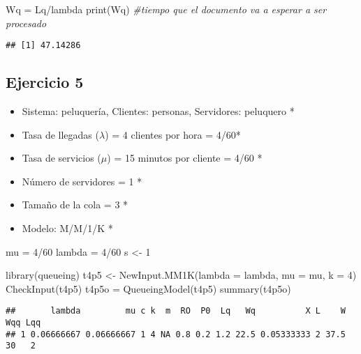 \documentclass[
]{article}
\newenvironment{Shaded}{\begin{snugshade}}{\end{snugshade}}
\newcommand{\AttributeTok}[1]{\textcolor[rgb]{0.77,0.63,0.00}{#1}}
\newcommand{\CommentTok}[1]{\textcolor[rgb]{0.56,0.35,0.01}{\textit{#1}}}
\newcommand{\DecValTok}[1]{\textcolor[rgb]{0.00,0.00,0.81}{#1}}
\newcommand{\FunctionTok}[1]{\textcolor[rgb]{0.00,0.00,0.00}{#1}}
\newcommand{\NormalTok}[1]{#1}
\newcommand{\OtherTok}[1]{\textcolor[rgb]{0.56,0.35,0.01}{#1}}
\newcommand{\SpecialCharTok}[1]{\textcolor[rgb]{0.00,0.00,0.00}{#1}}
\begin{document}
\begin{Shaded}
\begin{Highlighting}[]
\NormalTok{Wq }\OtherTok{=}\NormalTok{  Lq}\SpecialCharTok{/}\NormalTok{lambda}
\FunctionTok{print}\NormalTok{(Wq) }\CommentTok{\#tiempo que el documento va a esperar a ser procesado}
\end{Highlighting}
\end{Shaded}

\begin{verbatim}
## [1] 47.14286
\end{verbatim}

\hypertarget{ejercicio-5}{%
\subsection{Ejercicio 5}\label{ejercicio-5}}

\begin{itemize}
\item
  Sistema: peluquería, Clientes: personas, Servidores: peluquero *
\item
  Tasa de llegadas (\(\lambda\)) = 4 clientes por hora = 4/60*
\item
  Tasa de servicios (\(\mu\)) = 15 minutos por cliente = 4/60 *
\item
  Número de servidores = 1 *
\item
  Tamaño de la cola = 3 *
\item
  Modelo: M/M/1/K *
\end{itemize}

\begin{Shaded}
\begin{Highlighting}[]
\NormalTok{mu }\OtherTok{=} \DecValTok{4}\SpecialCharTok{/}\DecValTok{60}
\NormalTok{lambda }\OtherTok{=} \DecValTok{4}\SpecialCharTok{/}\DecValTok{60}
\NormalTok{s }\OtherTok{\textless{}{-}} \DecValTok{1}

\FunctionTok{library}\NormalTok{(queueing)}
\NormalTok{t4p5 }\OtherTok{\textless{}{-}} \FunctionTok{NewInput.MM1K}\NormalTok{(}\AttributeTok{lambda =}\NormalTok{ lambda, }\AttributeTok{mu =}\NormalTok{ mu, }\AttributeTok{k =} \DecValTok{4}\NormalTok{)}
\FunctionTok{CheckInput}\NormalTok{(t4p5)}
\NormalTok{t4p5o }\OtherTok{=} \FunctionTok{QueueingModel}\NormalTok{(t4p5)}
\FunctionTok{summary}\NormalTok{(t4p5o)}
\end{Highlighting}
\end{Shaded}

\begin{verbatim}
##       lambda         mu c k  m  RO  P0  Lq   Wq          X L    W Wqq Lqq
## 1 0.06666667 0.06666667 1 4 NA 0.8 0.2 1.2 22.5 0.05333333 2 37.5  30   2
\end{verbatim}
\end{document}
